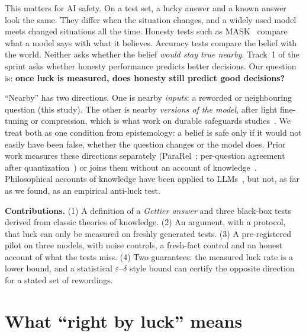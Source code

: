 \documentclass[10pt]{article}
\begin{document}
This matters for AI safety. On a test set, a lucky answer and a known answer look the same. They differ when the situation changes, and a widely used model meets changed situations all the time. Honesty tests such as MASK~\cite{mask} compare what a model says with what it believes. Accuracy tests compare the belief with the world. Neither asks whether the belief \emph{would stay true nearby}. Track~1 of the sprint asks whether honesty performance predicts better decisions. Our question is: \textbf{once luck is measured, does honesty still predict good decisions?}

``Nearby'' has two directions. One is nearby \emph{inputs}: a reworded or neighbouring question (this study). The other is nearby \emph{versions of the model}, after light fine-tuning or compression, which is what work on durable safeguards studies~\cite{repnoise,tar,durability}. We treat both as one condition from epistemology: a belief is safe only if it would not easily have been false, whether the question changes or the model does. Prior work measures these directions separately (ParaRel~\cite{pararel}; per-question agreement after quantization~\cite{rababah}) or joins them without an account of knowledge~\cite{dai,lopezpaz}. Philosophical accounts of knowledge have been applied to LLMs~\cite{fierro,herrmann}, but not, as far as we found, as an empirical anti-luck test.

\textbf{Contributions.} (1) A definition of a \emph{Gettier answer} and three black-box tests derived from classic theories of knowledge. (2) An argument, with a protocol, that luck can only be measured on freshly generated tests. (3) A pre-registered pilot on three models, with noise controls, a fresh-fact control and an honest account of what the tests miss. (4) Two guarantees: the measured luck rate is a lower bound, and a statistical $\varepsilon$--$\delta$ style bound can certify the opposite direction for a stated set of rewordings.

\section{What ``right by luck'' means}
\noindent{}
\end{document}
